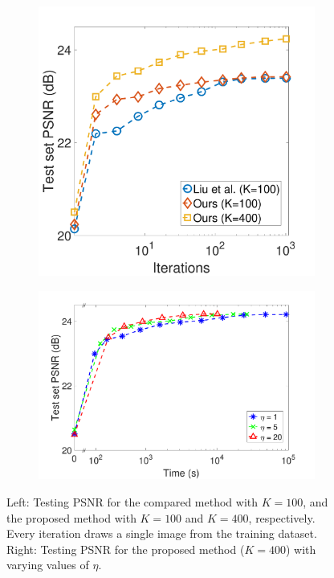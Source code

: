 \begin{figure}[h]
\centering
\begin{subfigure}{0.4\textwidth}
  \includegraphics[width=1\linewidth]{figure/overComplete-ite.pdf}
\end{subfigure} 
\begin{subfigure}{0.55\textwidth}
  \includegraphics[width=1\linewidth]{figure/minibatch.pdf}
\end{subfigure}

\caption{Left: Testing PSNR for the compared method with $K=100$, and the proposed method with $K=100$ and $K=400$, respectively. Every iteration draws a single image from the training dataset. Right: Testing PSNR for the proposed method ($K=400$) with varying values of $\eta$.}
\label{fig:overComDicAndMinibatch}
\end{figure}